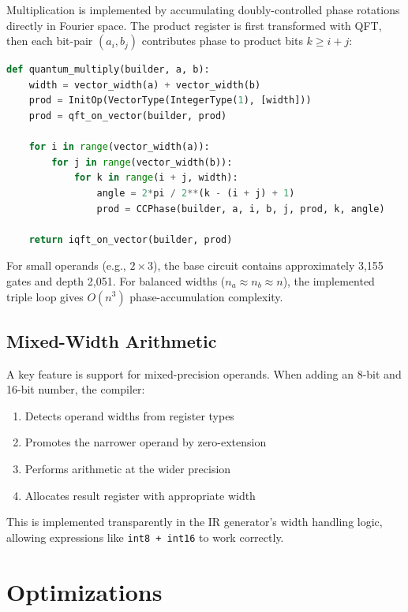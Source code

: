 \documentclass[a4paper,twocolumn]{article}
\begin{document}
Multiplication is implemented by accumulating doubly-controlled phase rotations directly in Fourier space. The product register
is first transformed with QFT, then each bit-pair $(a_i, b_j)$ contributes phase to product bits $k \ge i+j$:

\begin{lstlisting}[language=Python, caption={Multiplication via CCPhase Accumulation}]
def quantum_multiply(builder, a, b):
    width = vector_width(a) + vector_width(b)
    prod = InitOp(VectorType(IntegerType(1), [width]))
    prod = qft_on_vector(builder, prod)

    for i in range(vector_width(a)):
        for j in range(vector_width(b)):
            for k in range(i + j, width):
                angle = 2*pi / 2**(k - (i + j) + 1)
                prod = CCPhase(builder, a, i, b, j, prod, k, angle)

    return iqft_on_vector(builder, prod)
\end{lstlisting}

For small operands (e.g., $2 \times 3$), the base circuit contains approximately 3,155 gates and depth 2,051.
For balanced widths ($n_a \approx n_b \approx n$), the implemented triple loop gives $O(n^3)$ phase-accumulation complexity.

\subsection{Mixed-Width Arithmetic}

A key feature is support for mixed-precision operands. When adding an 8-bit and 16-bit number, the compiler:
\begin{enumerate}
  \item Detects operand widths from register types
  \item Promotes the narrower operand by zero-extension
  \item Performs arithmetic at the wider precision
  \item Allocates result register with appropriate width
\end{enumerate}

This is implemented transparently in the IR generator's width handling logic, allowing expressions
like \texttt{int8 + int16} to work correctly.

\section{Optimizations}
\end{document}
